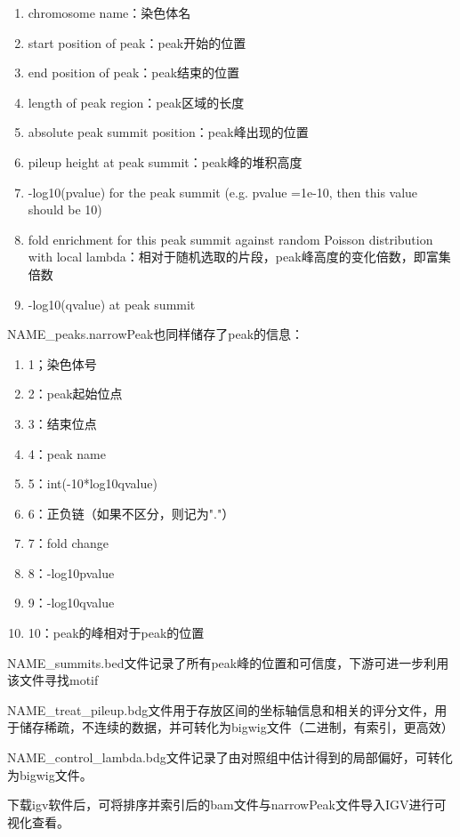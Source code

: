 \begin{enumerate}
    \item chromosome name：染色体名
    \item start position of peak：peak开始的位置
    \item end position of peak：peak结束的位置
    \item length of peak region：peak区域的长度
    \item absolute peak summit position：peak峰出现的位置
    \item pileup height at peak summit：peak峰的堆积高度
    \item -log10(pvalue) for the peak summit (e.g. pvalue =1e-10, then this value should be 10)
    \item fold enrichment for this peak summit against random Poisson distribution with local lambda：相对于随机选取的片段，peak峰高度的变化倍数，即富集倍数
    \item -log10(qvalue) at peak summit
\end{enumerate}
NAME\_peaks.narrowPeak也同样储存了peak的信息：
\begin{enumerate}
    \item 1；染色体号
    \item 2：peak起始位点
    \item 3：结束位点
    \item 4：peak name
    \item 5：int(-10*log10qvalue)
    \item 6：正负链（如果不区分，则记为"."）
    \item 7：fold change
    \item 8：-log10pvalue
    \item 9：-log10qvalue
    \item 10：peak的峰相对于peak的位置
\end{enumerate}
NAME\_summits.bed文件记录了所有peak峰的位置和可信度，下游可进一步利用该文件寻找motif\par
NAME\_treat\_pileup.bdg文件用于存放区间的坐标轴信息和相关的评分文件，用于储存稀疏，不连续的数据，并可转化为bigwig文件（二进制，有索引，更高效）\par
NAME\_control\_lambda.bdg文件记录了由对照组中估计得到的局部偏好，可转化为bigwig文件。\par
下载igv软件后，可将排序并索引后的bam文件与narrowPeak文件导入IGV进行可视化查看。
